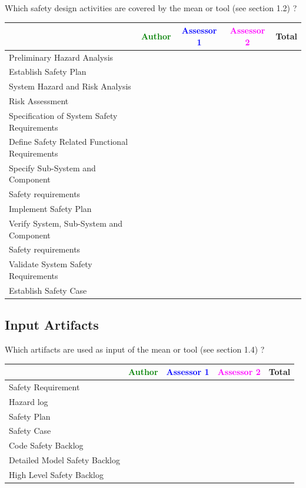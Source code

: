 Which safety design activities are covered by the mean or tool (see \citep{D4.2.a} section 1.2) ?

\begin{tabular}{|l | c | c | c | c|}
\hline
& \textcolor{green}{Author} & \textcolor{blue}{Assessor 1} & \textcolor{magenta}{Assessor 2} & Total \\
\hline 
Preliminary Hazard Analysis & & & &  \\
\hline
Establish Safety Plan & & & & \\
\hline
System Hazard and Risk Analysis & & & & \\
\hline
Risk Assessment & & & & \\
\hline
Specification of System Safety Requirements & & & &  \\
\hline
Define Safety Related Functional Requirements & & & & \\
\hline
Specify Sub-System and Component & & & & \\
Safety requirements & & & & \\
\hline
Implement Safety Plan & & & & \\
\hline
Verify System, Sub-System and Component & & & &  \\
Safety requirements & & & &  \\
\hline
Validate System Safety Requirements & & & & \\
\hline
Establish Safety Case & & & & \\
\hline
\end{tabular}


\subsection{Input Artifacts}

Which artifacts are used as input of the mean or tool (see \citep{D4.2.a} section 1.4) ? 


\begin{tabular}{|l | c | c | c | c|}
\hline
& \textcolor{green}{Author} & \textcolor{blue}{Assessor 1} & \textcolor{magenta}{Assessor 2} & Total \\
\hline 
Safety Requirement & & & &  \\
\hline
Hazard log & & & & \\
\hline
Safety Plan & & & & \\
\hline
Safety Case & & & & \\
\hline
Code Safety Backlog & & & &  \\
\hline
Detailed Model Safety Backlog & & & & \\
\hline
High Level Safety Backlog & & & & \\
\hline
\end{tabular}



